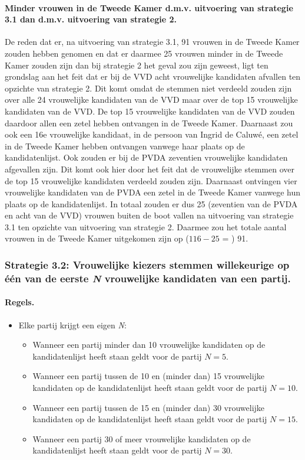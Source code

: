 \paragraph{Minder vrouwen in de Tweede Kamer d.m.v. uitvoering van strategie 3.1 dan d.m.v. uitvoering van strategie 2.}
De reden dat er, na uitvoering van strategie 3.1, 91 vrouwen in de Tweede Kamer zouden hebben genomen en dat er daarmee 25 vrouwen minder in de Tweede Kamer zouden zijn dan bij strategie 2 het geval zou zijn geweest, ligt ten grondslag aan het feit dat er bij de VVD acht vrouwelijke kandidaten afvallen ten opzichte van strategie 2. Dit komt omdat de stemmen niet verdeeld zouden zijn over alle 24 vrouwelijke kandidaten van de VVD maar over de top 15 vrouwelijke kandidaten van de VVD. De top 15 vrouwelijke kandidaten van de VVD zouden daardoor allen een zetel hebben ontvangen in de Tweede Kamer. Daarnaast zou ook een 16e vrouwelijke kandidaat, in de persoon van Ingrid de Caluwé, een zetel in de Tweede Kamer hebben ontvangen vanwege haar plaats op de kandidatenlijst. Ook zouden er bij de PVDA zeventien vrouwelijke kandidaten afgevallen zijn. Dit komt ook hier door het feit dat de vrouwelijke stemmen over de top 15 vrouwelijke kandidaten verdeeld zouden zijn. Daarnaast ontvingen vier vrouwelijke kandidaten van de PVDA een zetel in de Tweede Kamer vanwege hun plaats op de kandidatenlijst. In totaal zouden er dus 25 (zeventien van de PVDA en acht van de VVD) vrouwen buiten de boot vallen na uitvoering van strategie 3.1 ten opzichte van uitvoering van  strategie 2. Daarmee zou het totale aantal vrouwen in de Tweede Kamer uitgekomen zijn op ($116-25$ = ) 91. 



\subsubsection{Strategie 3.2: Vrouwelijke kiezers stemmen willekeurige op één van de eerste \textit{N} vrouwelijke kandidaten van een partij.}

\paragraph{Regels.}
\begin{itemize}
\item
Elke partij krijgt een eigen \textit{N}:

	\begin{itemize}
		\item
Wanneer een partij minder dan 10 vrouwelijke kandidaten op de kandidatenlijst heeft staan geldt voor de partij $N=5$.
		\item
Wanneer een partij tussen de 10 en (minder dan) 15 vrouwelijke kandidaten op de kandidatenlijst heeft staan geldt voor de partij $N=10$.
		\item
Wanneer een partij tussen de 15 en (minder dan) 30 vrouwelijke kandidaten op de kandidatenlijst heeft staan geldt voor de partij $N=15$.
		\item
Wanneer een partij 30 of meer vrouwelijke kandidaten op de kandidatenlijst heeft staan geldt voor de partij $N=30$.
	\end{itemize}
\end{itemize}


